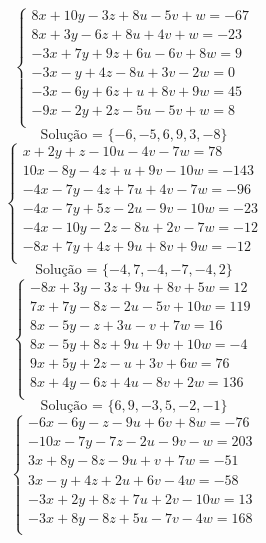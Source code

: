 \documentclass[12pt,oneside,a4paper]{article}
\begin{document}
\vspace{\baselineskip}
\begin{equation*}
\begin{cases}
8x+10y-3z+8u-5v+w=-67 \\
8x+3y-6z+8u+4v+w=-23 \\
-3x+7y+9z+6u-6v+8w=9 \\
-3x-y+4z-8u+3v-2w=0 \\
-3x-6y+6z+u+8v+9w=45 \\
-9x-2y+2z-5u-5v+w=8 \\
\end{cases}
\end{equation*}
\begin{equation*}
\text{Solução = }\{-6,-5,6,9,3,-8\}
\end{equation*}
\vspace{\baselineskip}
\begin{equation*}
\begin{cases}
x+2y+z-10u-4v-7w=78 \\
10x-8y-4z+u+9v-10w=-143 \\
-4x-7y-4z+7u+4v-7w=-96 \\
-4x-7y+5z-2u-9v-10w=-23 \\
-4x-10y-2z-8u+2v-7w=-12 \\
-8x+7y+4z+9u+8v+9w=-12 \\
\end{cases}
\end{equation*}
\begin{equation*}
\text{Solução = }\{-4,7,-4,-7,-4,2\}
\end{equation*}
\vspace{\baselineskip}
\begin{equation*}
\begin{cases}
-8x+3y-3z+9u+8v+5w=12 \\
7x+7y-8z-2u-5v+10w=119 \\
8x-5y-z+3u-v+7w=16 \\
8x-5y+8z+9u+9v+10w=-4 \\
9x+5y+2z-u+3v+6w=76 \\
8x+4y-6z+4u-8v+2w=136 \\
\end{cases}
\end{equation*}
\begin{equation*}
\text{Solução = }\{6,9,-3,5,-2,-1\}
\end{equation*}
\vspace{\baselineskip}
\begin{equation*}
\begin{cases}
-6x-6y-z-9u+6v+8w=-76 \\
-10x-7y-7z-2u-9v-w=203 \\
3x+8y-8z-9u+v+7w=-51 \\
3x-y+4z+2u+6v-4w=-58 \\
-3x+2y+8z+7u+2v-10w=13 \\
-3x+8y-8z+5u-7v-4w=168 \\
\end{cases}
\end{equation*}
\end{document}
